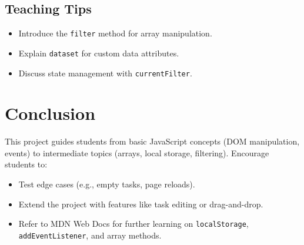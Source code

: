 \documentclass[a4paper,12pt]{article}
\begin{document}
\subsection{Teaching Tips}
\begin{itemize}
    \item Introduce the \texttt{filter} method for array manipulation.
    \item Explain \texttt{dataset} for custom data attributes.
    \item Discuss state management with \texttt{currentFilter}.
\end{itemize}

\section{Conclusion}
This project guides students from basic JavaScript concepts (DOM manipulation, events) to intermediate topics (arrays, local storage, filtering). Encourage students to:
\begin{itemize}
    \item Test edge cases (e.g., empty tasks, page reloads).
    \item Extend the project with features like task editing or drag-and-drop.
    \item Refer to MDN Web Docs for further learning on \texttt{localStorage}, \texttt{addEventListener}, and array methods.
\end{itemize}
\end{document}
